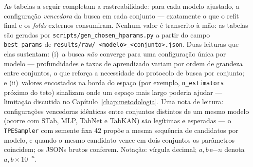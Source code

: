 As tabelas a seguir completam a rastreabilidade: para cada modelo
ajustado, a configuração \emph{vencedora} da busca em cada conjunto ---
exatamente o que o refit final e os \emph{folds} externos consumiram.
Nenhum valor é transcrito à mão: as tabelas são geradas por
\texttt{scripts/\allowbreak gen\_\allowbreak chosen\_\allowbreak hparams.\allowbreak py} a partir do campo
\texttt{best\_params} de \texttt{results/\allowbreak raw/\allowbreak
<modelo>\_\allowbreak <conjunto>.\allowbreak json}. Duas leituras que elas sustentam:
(i)~a busca \emph{não} converge para uma configuração única por modelo
--- profundidades e taxas de aprendizado variam por ordem de grandeza
entre conjuntos, o que reforça a necessidade do protocolo de busca por
conjunto; e (ii)~valores encostados na borda do espaço (por exemplo,
\texttt{n\_estimators} próximo do teto) sinalizam onde um espaço mais
largo poderia ajudar --- limitação discutida no
Capítulo~\ref{chap:metodologia}. Uma nota de leitura: configurações
vencedoras idênticas entre conjuntos distintos de um mesmo modelo
(ocorre com STab, MLP, TabNet e TabKAN) são legítimas e esperadas --- o
\texttt{TPESampler} com semente fixa 42 propõe a mesma sequência de
candidatos por modelo, e quando o mesmo candidato vence em dois
conjuntos os parâmetros coincidem; os JSONs brutos conferem. Notação:
vírgula decimal; \mbox{$a{,}b\,$e$-n$} denota $a{,}b \times 10^{-n}$.


